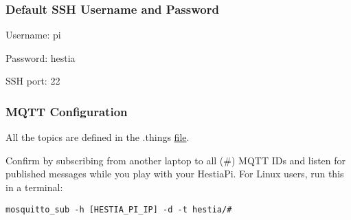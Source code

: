 \subsubsection{Default SSH Username and Password}

Username: pi

Password: hestia

SSH port: 22

\subsubsection{MQTT Configuration}
All the topics are defined in the .things
\href{https://github.com/HestiaPi/hestia-touch-openhab/wiki/File-Structure-&-Paths-ONE}{file}.

Confirm by subscribing from another laptop to all (\#) MQTT IDs and listen for
published messages while you play with your HestiaPi. For Linux users, run this
in a terminal:

\texttt{mosquitto\_sub -h [HESTIA\_PI\_IP] -d -t hestia/\#}
